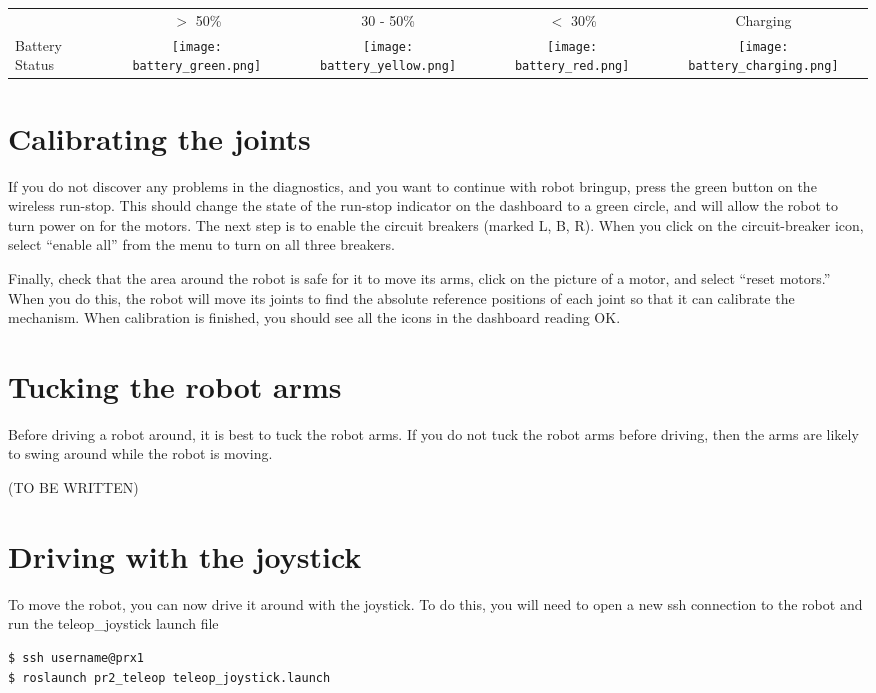 \begin{description}
    \begin{tabular}{m{2.5cm}SSSS}
     & $>$ 50\% & 30 - 50\% & $<$ 30\% & Charging\\
    Battery Status & \texttt{[image: battery\_green.png]}&
                     \texttt{[image: battery\_yellow.png]}&
                     \texttt{[image: battery\_red.png]}&
                     \texttt{[image: battery\_charging.png]}\\
   \end{tabular}


\end{description}

\section{Calibrating the joints}
If you do not discover any problems in the diagnostics, and you want to continue with robot bringup, press the green 
button on the wireless run-stop.  This should change the state of the run-stop indicator on the dashboard to a green 
circle, and will allow the robot to turn power on for the motors.  The next step is to enable the circuit breakers 
(marked L, B, R).  When you click on the circuit-breaker icon, select ``enable all'' from the menu to turn on all 
three breakers.

Finally, check that the area around the robot is safe for it to move its arms, click on the picture of a motor, and 
select ``reset motors.''  When you do this, the robot will move its joints to find the absolute reference positions of 
each joint so that it can calibrate the mechanism.  When calibration is finished, you should see all the icons in the 
dashboard reading OK.

\section{Tucking the robot arms}

Before driving a robot around, it is best to tuck the robot arms. If you do not tuck the robot arms before driving, then the arms are likely to swing around while the robot is moving.

(TO BE WRITTEN)

\section{Driving with the joystick}
To move the robot, you can now drive it around with the joystick.  To do this, you will need to open a new ssh connection 
to the robot and run the teleop\_joystick launch file
\begin{verbatim}
$ ssh username@prx1
$ roslaunch pr2_teleop teleop_joystick.launch 
\end{verbatim}

